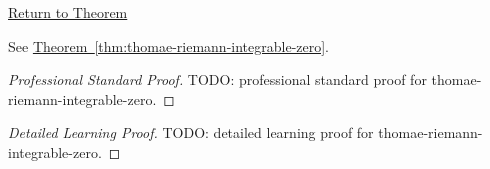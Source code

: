 \newpage
{}
\label{prf:thomae-riemann-integrable-zero}

\begin{remark*}[Return]
\hyperref[thm:thomae-riemann-integrable-zero]{Return to Theorem}
\end{remark*}

\begin{theorem*}
See \hyperref[thm:thomae-riemann-integrable-zero]{Theorem~\ref*{thm:thomae-riemann-integrable-zero}}.
\end{theorem*}

\begin{proof}[Professional Standard Proof]
\LRAProofBodyStart
TODO: professional standard proof for thomae-riemann-integrable-zero.
\end{proof}

\begin{proof}[Detailed Learning Proof]
\LRAProofBodyStart
TODO: detailed learning proof for thomae-riemann-integrable-zero.
\end{proof}

\begin{remark*}
\end{remark*}

\begin{dependencies}
\NoLocalDependencies
\end{dependencies}

\clearpage
